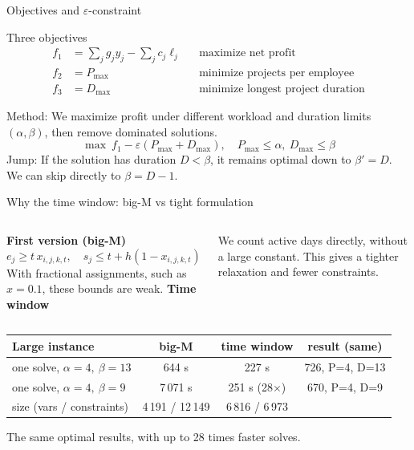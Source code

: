 \documentclass[aspectratio=169,11pt]{beamer}
\begin{document}
\begin{frame}{Objectives and $\varepsilon$-constraint}
\begin{block}{Three objectives}
\begin{align*}
f_1&=\textstyle\sum_j g_j y_j-\sum_j c_j\ell_j &&\text{maximize net profit}\\
f_2&=P_{\max} &&\text{minimize projects per employee}\\
f_3&=D_{\max} &&\text{minimize longest project duration}
\end{align*}
\end{block}
\small
\alert{Method:} We maximize profit under different workload and duration limits $(\alpha,\beta)$, then remove dominated solutions.
\[\max\ f_1-\varepsilon(P_{\max}+D_{\max}),\quad P_{\max}\le\alpha,\ D_{\max}\le\beta\]
\alert{Jump:} If the solution has duration $D<\beta$, it remains optimal down to $\beta'=D$. We can skip directly to $\beta=D-1$.
\end{frame}

\begin{frame}{Why the time window: big-M vs tight formulation}
\begin{columns}[T]
\textbf{First version (big-M)}
\[ e_j\ge t\,x_{i,j,k,t},\quad s_j\le t+h(1-x_{i,j,k,t}) \]
With fractional assignments, such as $x=0.1$, these bounds are weak.
\textbf{Time window}\par We count active days directly, without a large constant. This gives a tighter relaxation and fewer constraints.
\end{columns}
\vspace{0.6em}
\centering\footnotesize
\begin{tabular}{lccc}
\toprule
Large instance & big-M & time window & result (same)\\
\midrule
one solve, $\alpha=4,\ \beta=13$ & 644 s & 227 s & 726, P=4, D=13\\
one solve, $\alpha=4,\ \beta=9$ & 7\,071 s & 251 s (\alert{28$\times$}) & 670, P=4, D=9\\
size (vars / constraints) & 4\,191 / 12\,149 & 6\,816 / 6\,973 & \\
\bottomrule
\end{tabular}
\par\vspace{0.5em}\small The same optimal results, with up to \alert{28 times faster} solves.
\end{frame}
\end{document}
